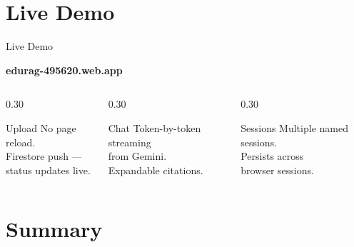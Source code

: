 \documentclass[aspectratio=169]{beamer}
\begin{document}
\section{Live Demo}

\begin{frame}[t]{Live Demo}
  \vspace{0.5cm}
  \begin{center}
    {\Large\bfseries\color{P1} edurag-495620.web.app}
  \end{center}
  \vspace{0.5cm}
  \begin{columns}[t]
    \begin{column}{0.30\textwidth}
      \begin{block}{Upload}
        {\small No page reload.\\
        Firestore push —\\
        status updates live.}
      \end{block}
    \end{column}
    \begin{column}{0.30\textwidth}
      \begin{block}{Chat}
        {\small Token-by-token streaming\\
        from Gemini.\\
        Expandable citations.}
      \end{block}
    \end{column}
    \begin{column}{0.30\textwidth}
      \begin{block}{Sessions}
        {\small Multiple named sessions.\\
        Persists across\\
        browser sessions.}
      \end{block}
    \end{column}
  \end{columns}
\end{frame}

\section{Summary}
\end{document}
